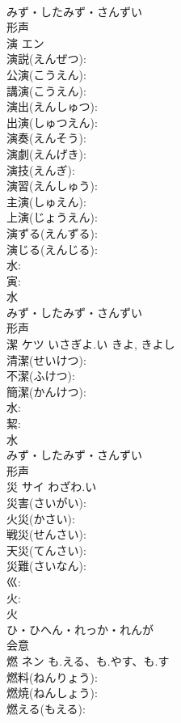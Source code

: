\documentclass[8pt]{extreport}
\begin{document}
\begin{CJK}{UTF8}{min}
\\	みず・したみず・さんずい	
\\	形声 
\\	演	エン			
\\	演説(えんぜつ): 
\\	公演(こうえん): 
\\	講演(こうえん): 
\\	演出(えんしゅつ): 
\\	出演(しゅつえん): 
\\	演奏(えんそう): 
\\	演劇(えんげき): 
\\	演技(えんぎ): 
\\	演習(えんしゅう): 
\\	主演(しゅえん): 
\\	上演(じょうえん): 
\\	演ずる(えんずる): 
\\	演じる(えんじる): 
\\	水: 
\\	寅: 
\\	水	
\\	みず・したみず・さんずい	
\\	形声 
\\	潔	ケツ	いさぎよ.い	きよ, きよし	
\\	清潔(せいけつ): 
\\	不潔(ふけつ): 
\\	簡潔(かんけつ): 
\\	水: 
\\	絜: 
\\	水	
\\	みず・したみず・さんずい	
\\	形声 
\\	災	サイ	わざわ.い		
\\	災害(さいがい): 
\\	火災(かさい): 
\\	戦災(せんさい): 
\\	天災(てんさい): 
\\	災難(さいなん): 
\\	巛: 
\\	火: 
\\	火	
\\	ひ・ひへん・れっか・れんが	
\\	会意 
\\	燃	ネン	も.える、も.やす、も.す		
\\	燃料(ねんりょう): 
\\	燃焼(ねんしょう): 
\\	燃える(もえる): 

\end{CJK}
\end{document}
